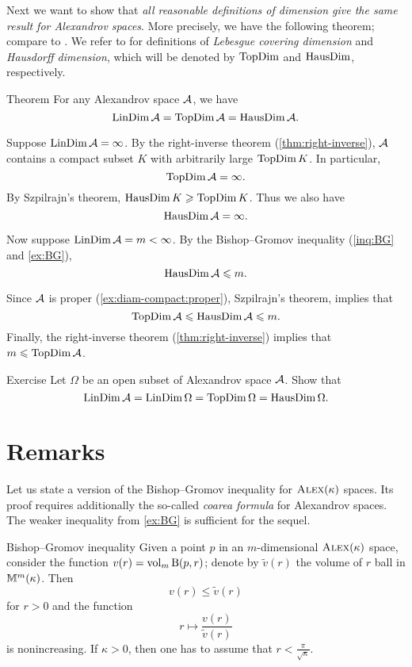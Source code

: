 Next we want to show that \textit{all reasonable definitions of dimension give the same result for Alexandrov spaces}.
More precisely, we have the following theorem; compare to \cite[15.16]{alexander-kapovitch-petrunin2024}.
We refer to \cite{hurewicz-wallman} for definitions of \emph{Lebesgue covering dimension} and \emph{Hausdorff dimension}, which will be denoted by $\mathop{\rm TopDim}\nolimits$ and
$\mathop{\rm HausDim}\nolimits$, respectively.

\begin{thm}{Theorem}\label{thm:dim=dim}
For any Alexandrov space $\mathcal{A}$, we have
\[\mathop{\rm LinDim}\nolimits \mathcal{A}=\mathop{\rm TopDim}\nolimits \mathcal{A}=\mathop{\rm HausDim}\nolimits \mathcal{A}.\]
\end{thm}

Suppose $\mathop{\rm LinDim}\nolimits \mathcal{A}=\infty$.
By the right-inverse theorem (\ref{thm:right-inverse}), $\mathcal{A}$ contains a compact subset $K$ with  arbitrarily large $\mathop{\rm TopDim}\nolimits K$.
In particular,
\[\mathop{\rm TopDim}\nolimits\mathcal{A}=\infty.\] 
By Szpilrajn's theorem,
$\mathop{\rm HausDim}\nolimits K\geqslant \mathop{\rm TopDim}\nolimits K$.
Thus we also have 
\[\mathop{\rm HausDim}\nolimits\mathcal{A}=\infty.\]

Now suppose $\mathop{\rm LinDim}\nolimits \mathcal{A}=m<\infty$.
By the Bishop--Gromov inequality (\ref{inq:BG} and \ref{ex:BG}), 
\[\mathop{\rm HausDim}\nolimits\mathcal{A}\leqslant m.\]

Since $\mathcal{A}$ is proper (\ref{ex:diam-compact:proper}),
Szpilrajn's theorem, implies that
\[\mathop{\rm TopDim}\nolimits\mathcal{A}\leqslant \mathop{\rm HausDim}\nolimits\mathcal{A}\leqslant m.\]
Finally, the right-inverse theorem (\ref{thm:right-inverse}) implies that $m\leqslant\mathop{\rm TopDim}\nolimits\mathcal{A}$.
\qeds

\begin{thm}{Exercise}\label{ex:dim=dim}
Let $\Omega$ be an open subset of Alexandrov space $\mathcal{A}$.
Show that 
\[\mathop{\rm LinDim}\nolimits \mathcal{A}=\mathop{\rm LinDim}\nolimits \Omega=\mathop{\rm TopDim}\nolimits \Omega=\mathop{\rm HausDim}\nolimits \Omega.\]
\end{thm}

\section{Remarks}

Let us state a version of the Bishop--Gromov inequality for $\textsc{Alex}(\kappa)$ spaces.
Its proof requires additionally the so-called \textit{coarea formula} for Alexandrov spaces. 
The weaker inequality from \ref{ex:BG} is sufficient for the sequel.

\begin{thm}{Bishop--Gromov inequality}\label{inq:BG+}
Given a point $p$ in an $m$-dimensional $\textsc{Alex}(\kappa)$ space,
consider the function $v(r)=\operatorname{\rm vol}\nolimits_m\mathrm{B}{}(p,r)$;
denote by $\tilde v(r)$ the volume of $r$ ball in $\mathbb{M}^m(\kappa)$.
Then 
\[v(r)\le \tilde v(r)\]
for $r>0$ and the function 
\[r\mapsto \frac{v(r)}{\tilde v(r)}\] is nonincreasing.
If $\kappa>0$, then one has to assume that $r<\tfrac\pi{\sqrt\kappa}$.
\end{thm}

